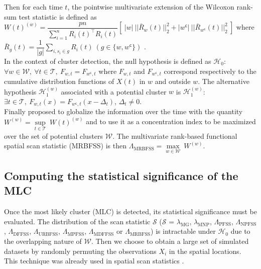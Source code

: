 \noindent Then for each time $t$, the pointwise multivariate extension of the Wilcoxon rank-sum test statistic is defined as $\displaystyle{W(t)^{(w)} = \dfrac{pn}{\sum_{i=1}^{n} R_i(t)^\top R_i(t)} \left[ \ |w| \ ||\bar{R}_w(t) ||_2^2 + |w^\mathsf{c}| \  ||\bar{R}_{w^\mathsf{c}}(t) ||_2^2 \ \right]}$ where \\ $\displaystyle{\bar{R}_{g}(t) = \dfrac{1}{|g|} \sum_{i, s_i \in g} R_i(t) \ (g \in \{ w, w^\mathsf{c} \})}$ . \\


\noindent In the context of cluster detection, the null hypothesis is defined as $\mathcal{H}_0$: $\forall w \in \mathcal{W}, \ \forall t \in \mathcal{T}, \ F_{w,t} = F_{w^\mathsf{c},t}$ where $F_{w,t}$ and $F_{w^\mathsf{c},t}$ correspond respectively to the cumulative distribution functions of $X(t)$ in $w$ and outside $w$. The alternative hypothesis $\mathcal{H}_1^{(w)}$ associated with a potential cluster $w$ is $\mathcal{H}_1^{(w)}$: $\exists t \in \mathcal{T}, \ F_{w,t}(x) = F_{w^\mathsf{c},t}(x-\Delta_t)$, $\Delta_t \neq 0$. \\

\noindent Finally \citet{notre_fonctionnel1} proposed to globalize the information over the time with the quantity $W^{(w)} = \underset{t \in \mathcal{T}}{\sup} \ W(t)^{(w)}$ and to use it as a concentration index to be maximized over the set of potential clusters $\mathcal{W}$. The multivariate rank-based functional spatial scan statistic (MRBFSS) is then $
\Lambda_{\text{MRBFSS}} = \underset{w \in \mathcal{W}}{\max} \  W^{(w)}.$

\subsection{Computing the statistical significance of the MLC} \label{sec:signif}

\noindent Once the most likely cluster (MLC) is detected, its statistical significance must be evaluated.  
The distribution of the scan statistic $\mathcal{S}$ ($\mathcal{S}$ = $\lambda_{\text{MG}}$, $\lambda_{\text{MNP}}$, $\Lambda_{\text{PFSS}}$, $\Lambda_{\text{NPFSS}}$, $\Lambda_{\text{DFFSS}}$, $\Lambda_{\text{URBFSS}}$, $\Lambda_{\text{MPFSS}}$, $\Lambda_{\text{MDFFSS}}$ or $\Lambda_{\text{MRBFSS}}$) is intractable under $\mathcal{H}_0$ due to the overlapping nature of $\mathcal{W}$. Then we choose to obtain  a large set of simulated datasets by randomly permuting the observations $X_i$ in the spatial locations. This technique was already used in spatial scan statistics \citep{normalkulldorff, a_multivariate_gaussian}.

